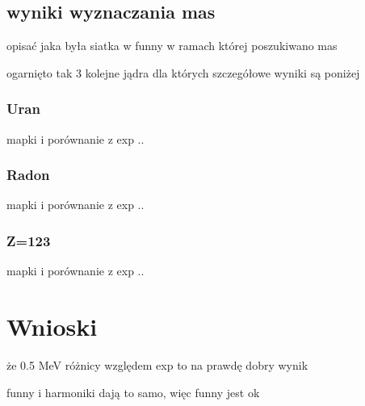 \documentclass[polish]{article}
\numberwithin{equation}{section}
\begin{document}
\subsection{wyniki wyznaczania mas}

opisać jaka była siatka w funny w ramach której poszukiwano mas

ogarnięto tak 3 kolejne jądra dla których szczegółowe wyniki są poniżej

\subsubsection{Uran}
mapki i porównanie z exp .. 

\subsubsection{Radon}
mapki i porównanie z exp .. 

\subsubsection{Z=123}
mapki i porównanie z exp .. 


\section{Wnioski}

że 0.5 MeV różnicy względem exp to na prawdę dobry wynik

funny i harmoniki dają to samo, więc funny jest ok
\end{document}
